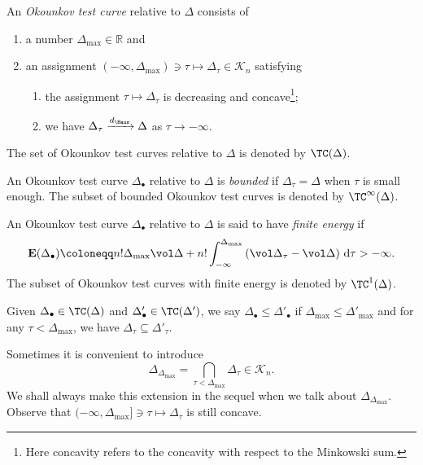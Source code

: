 \begin{definition}\label{def:Otc}
	An \emph{Okounkov test curve} relative to $\Delta$ consists of
    \begin{enumerate}
        \item\label{itm:def:Otc:1} a number $\Delta_{\max}\in \mathbb{R}$ and
        \item\label{itm:def:Otc:2} an assignment $(-\infty,\Delta_{\max})\ni\tau \mapsto \Delta_{\tau}\in \mathcal{K}_n$ satisfying
        \begin{enumerate}
            \item\label{itm:def:Otc:2:a} the assignment $\tau\mapsto \Delta_{\tau}$ is decreasing and concave\footnote{Here concavity refers to the concavity with respect to the Minkowski sum.};
            \item\label{itm:def:Otc:2:b} we have $\Delta_{\tau}\xrightarrow{d_{\Haus}}\Delta$ as $\tau\to-\infty$.
        \end{enumerate}
    \end{enumerate}
    The set of Okounkov test curves relative to $\Delta$ is denoted by $\TC(\Delta)$\index{$\TC(\Delta)$}.

    An Okounkov test curve $\Delta_{\bullet}$ relative to $\Delta$ is \emph{bounded} if $\Delta_{\tau}=\Delta$ when $\tau$ is small enough. The subset of bounded Okounkov test curves is denoted by $\TC^{\infty}(\Delta)$\index{$\TC^{\infty}(\Delta)$}.

    An Okounkov test curve $\Delta_{\bullet}$ relative to $\Delta$ is said to have \emph{finite energy} if
    \begin{equation}\label{eq:Otestcurvenergy}
    \mathbf{E}(\Delta_{\bullet})\coloneqq n!\Delta_{\max} \vol \Delta+n!\int_{-\infty}^{\Delta_{\max}} \left(\vol \Delta_{\tau}-\vol \Delta\right)\,\mathrm{d}\tau>-\infty.
    \end{equation}
    The subset of Okounkov test curves with finite energy is denoted by $\TC^{1}(\Delta)$.

    Given $\Delta_{\bullet}\in \TC(\Delta)$ and $\Delta'_{\bullet}\in \TC(\Delta')$, we say $\Delta_{\bullet}\leq \Delta'_{\bullet}$ if $\Delta_{\max}\leq \Delta'_{\max}$ and for any $\tau<\Delta_{\max}$, we have $\Delta_{\tau}\subseteq \Delta'_{\tau}$.
\end{definition}
Sometimes it is convenient to introduce
\begin{equation}\label{eq:DeltaDeltamax}
    \Delta_{\Delta_{\max}}=\bigcap_{\tau<\Delta_{\max}}\Delta_{\tau}\in \mathcal{K}_n.
\end{equation}
We shall always make this extension in the sequel when we talk about $\Delta_{\Delta_{\max}}$. Observe that $(-\infty,\Delta_{\max}]\ni\tau \mapsto \Delta_{\tau}$ is still concave.

